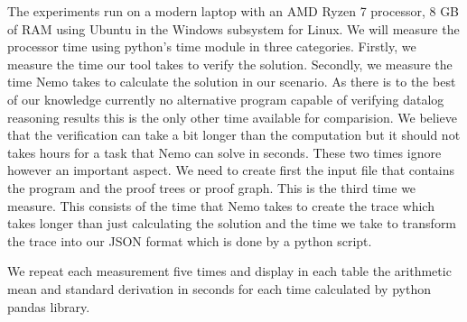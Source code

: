 The experiments run on a modern laptop with an AMD Ryzen 7 processor, 8 GB of RAM using Ubuntu in the Windows subsystem for Linux.
We will measure the processor time using python's time module in three categories. Firstly, we measure the time our tool takes to verify the solution. Secondly, we measure the time Nemo takes to calculate the solution in our scenario. As there is to the best of our knowledge currently no alternative program capable of verifying datalog reasoning results this is the only other time available for comparision. We believe that the verification can take a bit longer than the computation but it should not takes hours for a task that Nemo can solve in seconds. 
These two times ignore however an important aspect. We need to create first the input file that contains the program and the proof trees or proof graph. This is the third time we measure. This consists of the time that Nemo takes to create the trace which takes longer than just calculating the solution and the time we take to transform the trace into our JSON format which is done by a python script.

We repeat each measurement five times and display in each table the arithmetic mean and standard derivation in seconds for each time calculated by python pandas library.


